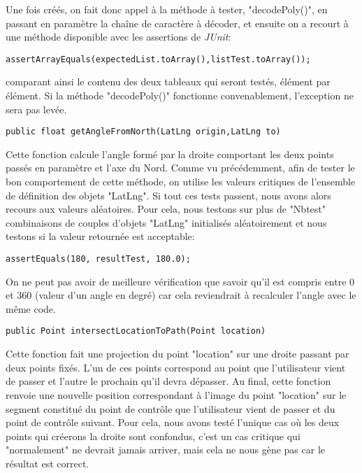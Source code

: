 Une fois créés, on fait donc appel à la méthode à tester, "decodePoly()", en passant en paramètre la chaîne de caractère à décoder, et ensuite on a recourt à une méthode disponible avec les assertions de \textit{JUnit}:

\begin{lstlisting}
assertArrayEquals(expectedList.toArray(),listTest.toArray());
\end{lstlisting}\bigskip

comparant ainsi le contenu des deux tableaux qui seront testés, élément par élément. Si la méthode "decodePoly()" fonctionne convenablement, l'exception ne sera pas levée.\newline\bigskip

\begin{lstlisting}
public float getAngleFromNorth(LatLng origin,LatLng to)
\end{lstlisting}\bigskip

Cette fonction calcule l'angle formé par la droite comportant les deux points passés en paramètre et l'axe du Nord. Comme vu précédemment, afin de tester le bon comportement de cette méthode, on utilise les valeurs critiques de l'ensemble de définition des objets "LatLng". Si tout ces tests passent, nous avons alors recours aux valeurs aléatoires. Pour cela, nous testons sur plus de "Nbtest" combinaisons de couples d'objets "LatLng" initialisés aléatoirement et nous testons si la valeur retournée est acceptable:

\begin{lstlisting}
assertEquals(180, resultTest, 180.0);
\end{lstlisting}\bigskip

On ne peut pas avoir de meilleure vérification que savoir qu'il est compris entre 0 et 360 (valeur d'un angle en degré) car cela reviendrait à recalculer l'angle avec le même code.\\

\begin{lstlisting}
public Point intersectLocationToPath(Point location)
\end{lstlisting}\bigskip

Cette fonction fait une projection du point "location" sur une droite passant par deux points fixés. L'un de ces points correspond au point que l'utilisateur vient de passer et l'autre le prochain qu'il devra dépasser. Au final, cette fonction renvoie une nouvelle position correspondant à l'image du point "location" sur le segment constitué du point de contrôle que l'utilisateur vient de passer et du point de contrôle suivant. Pour cela, nous avons testé l'unique cas où les deux points qui créerons la droite sont confondus, c'est un cas critique qui "normalement" ne devrait jamais arriver, mais cela ne nous gène pas car le résultat est correct.


